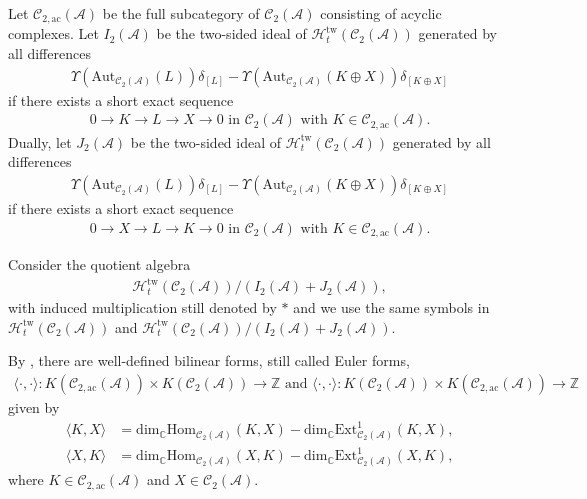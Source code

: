 \documentclass[12pt]{amsart}
\theoremstyle{definition}
\numberwithin{equation}{section}
\begin{document}
Let $ \mathcal{C}_{2,\mathrm{ac}}(\mathcal{A}) $ be the full subcategory of $ \mathcal{C}_2(\mathcal{A}) $ consisting of acyclic complexes. 
Let $ I_2(\mathcal{A}) $ be the two-sided ideal of $ \mathcal{H}_t^{\mathrm{tw}}(\mathcal{C}_2(\mathcal{A})) $ generated by all differences
\begin{align*}
    \Upsilon(\mathrm{Aut}_{\mathcal{C}_2(\mathcal{A})}(L))\delta_{[L]} - \Upsilon(\mathrm{Aut}_{\mathcal{C}_2(\mathcal{A})}(K \oplus X))\delta_{[K \oplus X]} 
\end{align*}
if there exists a short exact sequence
\begin{align*}
     0 \to K \to L \to X \to 0  \text{ in } \mathcal{C}_2(\mathcal{A})  \text{ with } K \in \mathcal{C}_{2,\mathrm{ac}}(\mathcal{A}).
\end{align*}
Dually, let $ J_2(\mathcal{A}) $ be the two-sided ideal of $ \mathcal{H}_t^{\mathrm{tw}}(\mathcal{C}_2(\mathcal{A})) $ generated by all differences
\begin{align*}
    \Upsilon(\mathrm{Aut}_{\mathcal{C}_2(\mathcal{A})}(L))\delta_{[L]} - \Upsilon(\mathrm{Aut}_{\mathcal{C}_2(\mathcal{A})}(K \oplus X))\delta_{[K \oplus X]} 
\end{align*}
if there exists a short exact sequence
\begin{align*}
     0 \to X \to L \to K \to 0  \text{ in } \mathcal{C}_2(\mathcal{A})  \text{ with } K \in \mathcal{C}_{2,\mathrm{ac}}(\mathcal{A}).
\end{align*}

Consider the quotient algebra
\begin{align*}
    \mathcal{H}_t^{\mathrm{tw}}(\mathcal{C}_2(\mathcal{A}))/(I_2(\mathcal{A})+J_2(\mathcal{A})),
\end{align*}
with induced multiplication still denoted by $ * $ and we use the same symbols in $ \mathcal{H}_t^{\mathrm{tw}}(\mathcal{C}_2(\mathcal{A})) $ and $ \mathcal{H}_t^{\mathrm{tw}}(\mathcal{C}_2(\mathcal{A}))/(I_2(\mathcal{A})+J_2(\mathcal{A})) $.

By \cite[Proposition 2.3]{LP21},  there are well-defined bilinear forms, still called Euler forms, 
\begin{align*}
    \langle \cdot, \cdot \rangle : K(\mathcal{C}_{2,\mathrm{ac}}(\mathcal{A})) \times K(\mathcal{C}_2(\mathcal{A})) \to \mathbb{Z} \text{ and }
     \langle \cdot, \cdot \rangle : K(\mathcal{C}_2(\mathcal{A})) \times K(\mathcal{C}_{2,\mathrm{ac}}(\mathcal{A})) \to \mathbb{Z}
\end{align*}
given by
\begin{align*}
    \langle K,X \rangle &=  \mathrm{dim}_{\mathbb{C}}\mathrm{Hom}_{\mathcal{C}_2(\mathcal{A})}(K,X) - \mathrm{dim}_{\mathbb{C}}\mathrm{Ext}^1_{\mathcal{C}_2(\mathcal{A})}(K,X), \\
    \langle X,K \rangle &=  \mathrm{dim}_{\mathbb{C}}\mathrm{Hom}_{\mathcal{C}_2(\mathcal{A})}(X,K) - \mathrm{dim}_{\mathbb{C}}\mathrm{Ext}^1_{\mathcal{C}_2(\mathcal{A})}(X,K), 
\end{align*}
where $ K \in \mathcal{C}_{2,\mathrm{ac}}(\mathcal{A})  $ and $ X \in \mathcal{C}_2(\mathcal{A}) $. 
\end{document}
